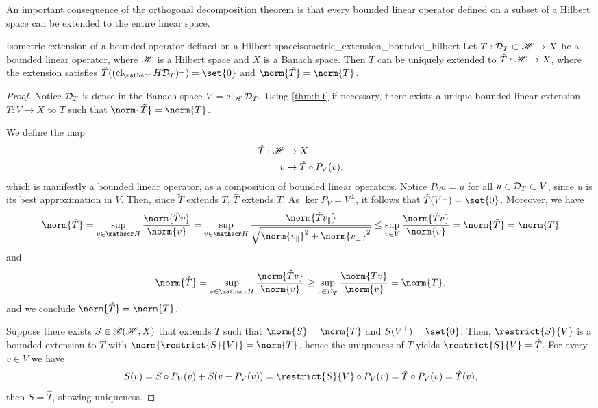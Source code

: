 An important consequence of the orthogonal decomposition theorem is that every bounded linear operator defined on a subset of a Hilbert space can be extended to the entire linear space.
\begin{theorem}{Isometric extension of a bounded operator defined on a Hilbert space}{isometric_extension_bounded_hilbert}
    Let \(T : \mathcal{D}_{T} \subset \mathscr{H} \to X\) be a bounded linear operator, where \(\mathscr{H}\) is a Hilbert space and \(X\) is a Banach space. Then \(T\) can be uniquely extended to \(\hat{T} : \mathscr{H} \to X\), where the extension satisfies \(\hat{T}((\cl_\hilbert\domain{T})^\perp) = \set{0}\) and \(\norm{\hat{T}} = \norm{T}\).
\end{theorem}
\begin{proof}
    Notice \(\mathcal{D}_{T}\) is dense in the Banach space \(V = \operatorname{cl}_{\mathscr{H}}{\mathcal{D}_{T}}.\) Using \cref{thm:blt} if necessary, there exists a unique bounded linear extension \(\tilde{T} : V \to X\) to \(T\) such that \(\norm{\tilde{T}} = \norm{T}\).

    We define the map
    \begin{align*}
        \hat{T} : \mathscr{H} &\to X\\
                         v &\mapsto \tilde{T} \circ P_V (v),
    \end{align*}
    which is manifestly a bounded linear operator, as a composition of bounded linear operators. Notice \(P_Vu = u\) for all \(u \in \mathcal{D}_{T}\subset V\), since \(u\) is its best approximation in \(V\). Then, since \(\tilde{T}\) extends \(T\), \(\hat{T}\) extends \(T\). As \(\ker{P_V} = V^\perp\), it follows that \(\hat{T}(V^\perp) = \set{0}\). Moreover, we have
    \begin{equation*}
        \norm{\hat{T}} = \sup_{v \in \hilbert}{\frac{\norm{\hat{T}v}}{\norm{v}}}= \sup_{v \in \hilbert}{\frac{\norm{\tilde{T}v_\parallel}}{\sqrt{\norm{v_\parallel}^2 + \norm{v_\perp}^2}}} \leq \sup_{v\in V}{\frac{\norm{\tilde{T}v}}{\norm{v}}} = \norm{\tilde{T}} = \norm{T}
    \end{equation*}
    and
    \begin{equation*}
        \norm{\hat{T}} = \sup_{v \in \hilbert}{\frac{\norm{\hat{T}v}}{\norm{v}}} \geq \sup_{v\in\domain{T}}{\frac{\norm{Tv}}{\norm{v}}} = \norm{T},
    \end{equation*}
    and we conclude \(\norm{\hat{T}} = \norm{T}\).

    Suppose there exists \(S \in \mathscr{B}(\mathscr{H}, X)\) that extends \(T\) such that \(\norm{S} = \norm{T}\) and \(S(V^\perp) = \set{0}\). Then, \(\restrict{S}{V}\) is a bounded extension to \(T\) with \(\norm{\restrict{S}{V}} = \norm{T}\), hence the uniqueness of \(\tilde{T}\) yields \(\restrict{S}{V} = \tilde{T}\). For every \(v \in V\) we have
    \begin{equation*}
        S(v) = S\circ P_V(v) + S(v - P_V(v)) = \restrict{S}{V} \circ P_V(v) = \tilde{T}\circ P_V (v) = \hat{T}(v),
    \end{equation*}
    then \(S = \hat{T}\), showing uniqueness.
\end{proof}

